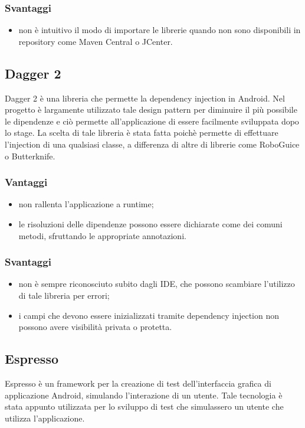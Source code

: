 \documentclass[../Tesi.tex]{subfiles}
\begin{document}
		\subsubsection{Svantaggi}
			\begin{itemize}
				\item non è intuitivo il modo di importare le librerie quando non sono disponibili in repository come Maven Central o JCenter.
			\end{itemize}

	\subsection{Dagger 2}
		Dagger 2 è una libreria che permette la dependency injection in Android. Nel progetto è largamente utilizzato tale design pattern per diminuire il più possibile le dipendenze e ciò permette all'applicazione di essere facilmente sviluppata dopo lo stage. La scelta di tale libreria è stata fatta poichè permette di effettuare l'injection di una qualsiasi classe, a differenza di altre di librerie come RoboGuice o Butterknife.
		\subsubsection{Vantaggi}
			\begin{itemize}
				\item non rallenta l'applicazione a runtime;
				\item le risoluzioni delle dipendenze possono essere dichiarate come dei comuni metodi, sfruttando le appropriate annotazioni.
			\end{itemize}
		\subsubsection{Svantaggi}
			\begin{itemize}
				\item non è sempre riconosciuto subito dagli IDE, che possono scambiare l'utilizzo di tale libreria per errori;
				\item i campi che devono essere inizializzati tramite dependency injection non possono avere visibilità privata o protetta.
			\end{itemize}

	\subsection{Espresso}
		Espresso è un framework per la creazione di test dell'interfaccia grafica di applicazione Android, simulando l'interazione di un utente. Tale tecnologia è stata appunto utilizzata per lo sviluppo di test che simulassero un utente che utilizza l'applicazione.
\end{document}
